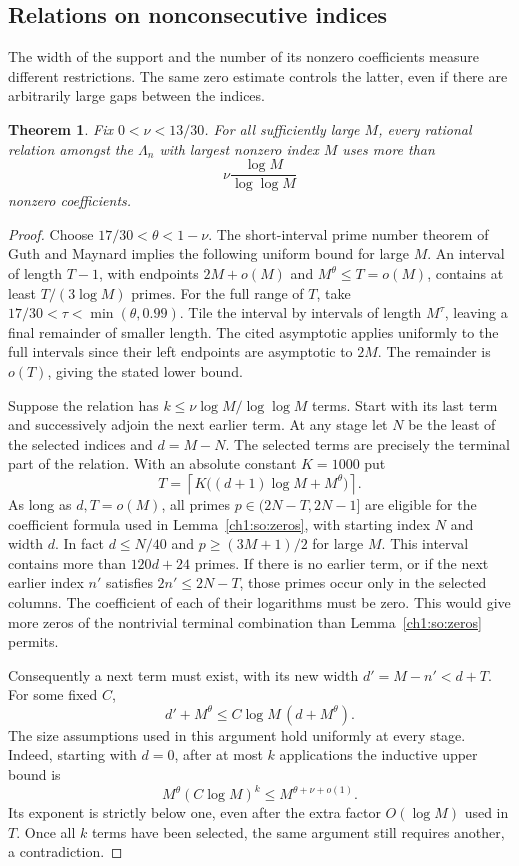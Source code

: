 \documentclass[11pt,a4paper,oneside,openany]{report}
\newtheorem{theorem}{Theorem}[section]
\theoremstyle{remark}\newtheorem{remark}[theorem]{Remark}
\numberwithin{equation}{section}
\begin{document}
\subsection{Relations on nonconsecutive indices}
The width of the support and the number of its nonzero coefficients measure different restrictions. The same zero estimate controls the latter, even if there are arbitrarily large gaps between the indices.

\begin{theorem}\label{ch1:so:sparse}
Fix $0<\nu<13/30$. For all sufficiently large $M$, every rational relation amongst the $\Lambda_n$ with largest nonzero index $M$ uses more than
\[
 \nu\frac{\log M}{\log\log M}
\]
nonzero coefficients.
\end{theorem}
\begin{proof}
Choose $17/30<\theta<1-\nu$. The short-interval prime number theorem of Guth and Maynard \cite[Corollary 1.3]{gm} implies the following uniform bound for large $M$. An interval of length $T-1$, with endpoints $2M+o(M)$ and $M^\theta\le T=o(M)$, contains at least $T/(3\log M)$ primes. For the full range of $T$, take $17/30<\tau<\min(\theta,0.99)$. Tile the interval by intervals of length $M^\tau$, leaving a final remainder of smaller length. The cited asymptotic applies uniformly to the full intervals since their left endpoints are asymptotic to $2M$. The remainder is $o(T)$, giving the stated lower bound.

Suppose the relation has $k\le\nu\log M/\log\log M$ terms. Start with its last term and successively adjoin the next earlier term. At any stage let $N$ be the least of the selected indices and $d=M-N$. The selected terms are precisely the terminal part of the relation. With an absolute constant $K=1000$ put
\[
 T=\left\lceil K\big((d+1)\log M+M^\theta\big)\right\rceil .
\]
As long as $d,T=o(M)$, all primes $p\in(2N-T,2N-1]$ are eligible for the coefficient formula used in Lemma~\ref{ch1:so:zeros}, with starting index $N$ and width $d$. In fact $d\le N/40$ and $p\ge (3M+1)/2$ for large $M$. This interval contains more than $120d+24$ primes. If there is no earlier term, or if the next earlier index $n'$ satisfies $2n'\le2N-T$, those primes occur only in the selected columns. The coefficient of each of their logarithms must be zero. This would give more zeros of the nontrivial terminal combination than Lemma~\ref{ch1:so:zeros} permits.

Consequently a next term must exist, with its new width $d'=M-n'<d+T$. For some fixed $C$,
\[
 d'+M^\theta\le C\log M\,(d+M^\theta).
\]
The size assumptions used in this argument hold uniformly at every stage. Indeed, starting with $d=0$, after at most $k$ applications the inductive upper bound is
\[
 M^\theta(C\log M)^k\le M^{\theta+\nu+o(1)}.
\]
Its exponent is strictly below one, even after the extra factor $O(\log M)$ used in $T$. Once all $k$ terms have been selected, the same argument still requires another, a contradiction.
\end{proof}
\end{document}
